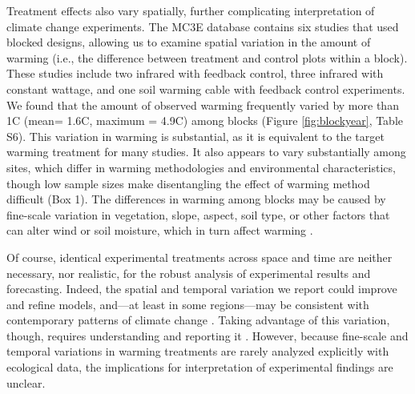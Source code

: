 \documentclass{article}
\begin{document}
\par Treatment effects also vary spatially, further complicating interpretation of climate change experiments. The MC3E database contains six studies that used blocked designs, allowing us to examine spatial variation in the amount of warming (i.e., the difference between treatment and control plots within a block). These studies include two infrared with feedback control, three infrared with constant wattage, and one soil warming cable with feedback control experiments. We found that the amount of observed warming frequently varied by more than 1\degree C (mean= 1.6\degree C, maximum = 4.9\degree C) among blocks (Figure \ref{fig:blockyear}, Table S6). This variation in warming is substantial, as it is equivalent to the target warming treatment for many studies. It also appears to vary substantially among sites, which differ in warming methodologies and environmental characteristics, though low sample sizes make disentangling the effect of warming method difficult (Box 1). The differences in warming among blocks may be caused by fine-scale variation in vegetation, slope, aspect, soil type, or other factors that can alter wind or soil moisture, which in turn affect warming \citep{peterjohn1993,kimball2005,kimball2008,hoeppner2012,rollinson2015}. %


\par Of course, identical experimental treatments across space and time are neither necessary, nor realistic, for the robust analysis of experimental results and forecasting. %
Indeed, the spatial and temporal variation we report could improve and refine models, and---at least in some regions---may be consistent with contemporary patterns of climate change \citep{ipcc2013}. Taking advantage of this variation, though, requires understanding and reporting it \citep[e.g.,][]{milcu2016}. However, because fine-scale and temporal variations in warming treatments are rarely analyzed explicitly with ecological data, the implications for interpretation of experimental findings are unclear.
\end{document}
